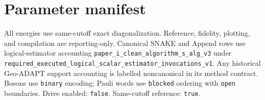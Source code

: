 \documentclass[10pt,letterpaper]{article}
\begin{document}
\section*{Parameter manifest}
\small
All energies use same-cutoff exact diagonalization. Reference, fidelity,
plotting, and compilation are reporting-only. Canonical SNAKE and Append rows
use logical-estimator accounting
\texttt{paper\_\allowbreak{}i\_\allowbreak{}clean\_\allowbreak{}algorithm\_\allowbreak{}s\_\allowbreak{}alg\_\allowbreak{}v3} under
\texttt{required\_\allowbreak{}executed\_\allowbreak{}logical\_\allowbreak{}scalar\_\allowbreak{}estimator\_\allowbreak{}invocations\_\allowbreak{}v1}. Any historical Geo-ADAPT
support accounting is labelled noncanonical in its method contract.
Bosons use \texttt{binary} encoding; Pauli words use
\texttt{blocked} ordering with
\texttt{open} boundaries. Drive enabled:
\texttt{false}. Same-cutoff reference:
\texttt{true}.
\end{document}
